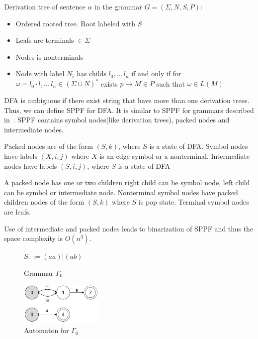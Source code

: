 \documentclass[runningheads,a4paper]{llncs}
\begin{document}
\begin{mydef}

Derivation tree of sentence $\alpha$ in the grammar $G=(\Sigma, N, S, P)$:

\begin{itemize}
\item Ordered rooted tree. Root labeled with $S$
\item Leafs are terminals $\in \Sigma$
\item Nodes is nonterminals
\item Node with label $N_i$ has childs $l_0, \dots\, l_n$ if and only if for $\omega = l_0 \cdot l_1 \dots\ l_n\in (\Sigma \cup N)^*$ exists $p \rightarrow M \in P$ such that $\omega \in L(M)$
\end{itemize}

\end{mydef}

DFA is ambiguous if there exist string that have more than one derivation trees. Thus, we can define SPPF for DFA. 
It is similar to SPPF for grammars described in~\cite{scott2013gll}. SPPF contains symbol nodes(like derivation trees), packed nodes
and intermediate nodes. 

Packed nodes are of the form $(S, k)$, where $S$ is a state of DFA. 
Symbol nodes have labels $(X, i, j)$ where $X$ is an edge symbol or a nonterminal. 
Intermediate nodes have labels $ (S, i, j) $, where $S$ is a state of DFA

A packed node has one or two children right child can be symbol node, left child can be symbol or intermediate node.   
Nonterminal symbol nodes have packed children nodes of the form $(S, k)$ where $S$ is pop state. 
Terminal symbol nodes are leafs.

 Use of intermediate and packed nodes leads to binarization of SPPF and thus the space complexity is $O(n^{3})$.

\begin{figure}
    \centering
    \parbox{2.9cm}{
        \begin{center}
            $S ::= (aa)|(ab)$
        \end{center}
        \caption{Grammar $\Gamma_{0}$}
        \label{fig:grammarG0}}
    \qquad
    \begin{minipage}{4cm}
        \includegraphics[width=4cm]{pictures/automatonForG0.pdf}
        \caption{Automaton for $\Gamma_{0}$}
        \label{fig:automatonForG0}
    \end{minipage}
\end{figure}
\end{document}
